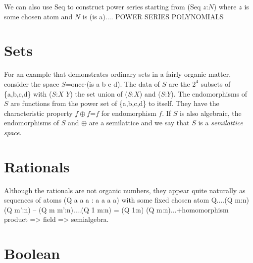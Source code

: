 \documentclass[11pt]{article}
\begin{document}
     We can also use Seq to construct power series starting from (Seq $z$:$N$) where $z$ is some chosen atom and $N$ is (is a)....
POWER SERIES
POLYNOMIALS

\section{Sets}

For an example that demonstrates ordinary sets in a fairly organic matter, consider the space $S$=once$\cdot$(is a b c d).  The data of $S$ 
are the $2^4$ subsets of \{a,b,c,d\} with ($S$:$X$ $Y$) the set union of ($S$:$X$) and ($S$:$Y$).  The endomorphisms of $S$ are functions 
from the power set of \{a,b,c,d\} to itself.  They have the characteristic property $f\oplus f$=$f$ for endomorphism $f$.  If $S$ is also algebraic, 
the endomorphisms of $S$ and $\oplus$ are a semilattice and we say that $S$ is a {\it semilattice space}. 

\section{Rationals} 

Although the rationals are not organic numbers, they appear quite naturally as sequences of atoms (Q a a a : a a a a) with some 
fixed chosen atom Q....(Q m:n) (Q m':n) -- (Q m m':n)....(Q 1 m:n) = (Q 1:n) (Q m:n)...+homomorphism product => field => semialgebra. 

\section{Boolean} 
\end{document}
